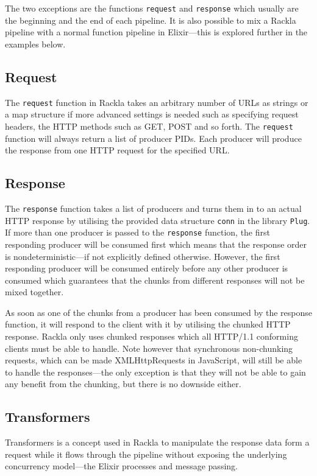 \documentclass{cslthse-msc}
\begin{document}
The two exceptions are the functions \lstinline{request} and \lstinline{response} which usually are the beginning and the end of each pipeline. It is also possible to mix a Rackla pipeline with a normal function pipeline in Elixir---this is explored further in the examples below.

\subsection{Request}
The \lstinline{request} function in Rackla takes an arbitrary number of URLs as strings or a map structure if more advanced settings is needed such as specifying request headers, the HTTP methods such as GET, POST and so forth. The \lstinline{request} function will always return a list of producer PIDs. Each producer will produce the response from one HTTP request for the specified URL.

\subsection{Response}
The \lstinline{response} function takes a list of producers and turns them in to an actual HTTP response by utilising the provided data structure \lstinline{conn} in the library \lstinline{Plug}. If more than one producer is passed to the \lstinline{response} function, the first responding producer will be consumed first which means that the response order is nondeterministic---if not explicitly defined otherwise. However, the first responding producer will be consumed entirely before any other producer is consumed which guarantees that the chunks from different responses will not be mixed together.

As soon as one of the chunks from a producer has been consumed by the response function, it will respond to the client with it by utilising the chunked HTTP response. Rackla only uses chunked responses which all HTTP/1.1 conforming clients must be able to handle\cite{chunked_required}. Note however that synchronous non-chunking requests, which can be made XMLHttpRequests in JavaScript, will still be able to handle the responses---the only exception is that they will not be able to gain any benefit from the chunking, but there is no downside either.

\subsection{Transformers}
Transformers is a concept used in Rackla to manipulate the response data form a request while it flows through the pipeline without exposing the underlying concurrency model---the Elixir processes and message passing.
\end{document}
